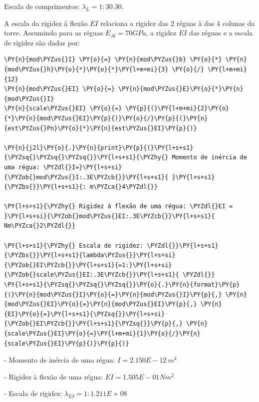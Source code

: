     Escala de comprimentos: $ \lambda_L = 1:30.30 $.

    
    A escala da rigidez à flexão \(EI\) relaciona a rigidez das 2 réguas à
das 4 colunas da torre. Assumindo para as réguas \(E_{Al}=70 GPa\), a
rigidez \(EI\) das réguas e a escala de rigidez são dadas por:

    \begin{tcolorbox}[breakable, size=fbox, boxrule=1pt, pad at break*=1mm,colback=cellbackground, colframe=cellborder]
\begin{Verbatim}[commandchars=\\\{\}]
\PY{n}{mod\PYZus{}I} \PY{o}{=} \PY{n}{mod\PYZus{}b} \PY{o}{*} \PY{n}{mod\PYZus{}h}\PY{o}{*}\PY{o}{*}\PY{l+m+mi}{3} \PY{o}{/} \PY{l+m+mi}{12}
\PY{n}{mod\PYZus{}EI} \PY{o}{=} \PY{n}{mod\PYZus{}E}\PY{o}{*}\PY{n}{mod\PYZus{}I}
\PY{n}{scale\PYZus{}EI} \PY{o}{=} \PY{p}{(}\PY{l+m+mi}{2}\PY{o}{*}\PY{n}{mod\PYZus{}EI}\PY{p}{)}\PY{o}{/}\PY{p}{(}\PY{n}{est\PYZus{}Pn}\PY{o}{*}\PY{n}{est\PYZus{}EI}\PY{p}{)}

\PY{n}{j2l}\PY{o}{.}\PY{n}{print}\PY{p}{(}\PY{l+s+s1}{\PYZsq{}\PYZsq{}\PYZsq{}}\PY{l+s+s1}{\PYZhy{} Momento de inércia de uma régua: \PYZdl{}I=}\PY{l+s+si}{\PYZob{}mod\PYZus{}I:.3E\PYZcb{}}\PY{l+s+s1}{ }\PY{l+s+s1}{\PYZbs{}}\PY{l+s+s1}{: m\PYZca{}4\PYZdl{}}

\PY{l+s+s1}{\PYZhy{} Rigidez à flexão de uma régua: \PYZdl{}EI = }\PY{l+s+si}{\PYZob{}mod\PYZus{}EI:.3E\PYZcb{}}\PY{l+s+s1}{ Nm\PYZca{}2\PYZdl{}}

\PY{l+s+s1}{\PYZhy{} Escala de rigidez: \PYZdl{}}\PY{l+s+s1}{\PYZbs{}}\PY{l+s+s1}{lambda\PYZus{}}\PY{l+s+si}{\PYZob{}EI\PYZcb{}}\PY{l+s+s1}{=1:}\PY{l+s+si}{\PYZob{}scale\PYZus{}EI:.3E\PYZcb{}}\PY{l+s+s1}{ \PYZdl{}}
\PY{l+s+s1}{\PYZsq{}\PYZsq{}\PYZsq{}}\PY{o}{.}\PY{n}{format}\PY{p}{(}\PY{n}{mod\PYZus{}I}\PY{o}{=}\PY{n}{mod\PYZus{}I}\PY{p}{,} \PY{n}{mod\PYZus{}EI}\PY{o}{=}\PY{n}{mod\PYZus{}EI}\PY{p}{,} \PY{n}{EI}\PY{o}{=}\PY{l+s+s1}{\PYZsq{}}\PY{l+s+si}{\PYZob{}EI\PYZcb{}}\PY{l+s+s1}{\PYZsq{}}\PY{p}{,} \PY{n}{scale\PYZus{}EI}\PY{o}{=}\PY{l+m+mi}{1}\PY{o}{/}\PY{n}{scale\PYZus{}EI}\PY{p}{)}\PY{p}{)}
\end{Verbatim}
\end{tcolorbox}

    - Momento de inércia de uma régua: $I=2.150E-12 \: m^4$

- Rigidez à flexão de uma régua: $EI = 1.505E-01 Nm^2$

- Escala de rigidez: $\lambda_{EI}=1:1.211E+08 $


